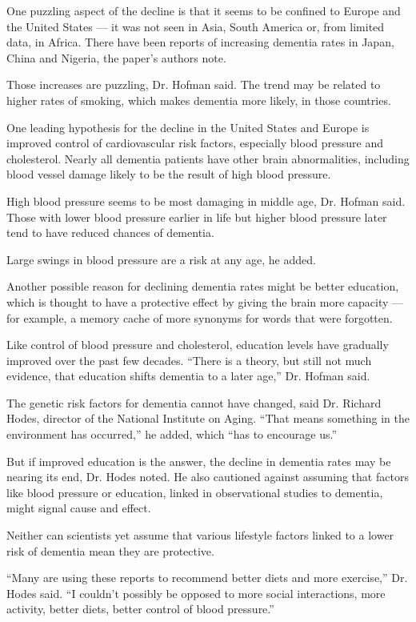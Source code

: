 One puzzling aspect of the decline is that it seems to be confined to
Europe and the United States --- it was not seen in Asia, South America
or, from limited data, in Africa. There have been reports of increasing
dementia rates in Japan, China and Nigeria, the paper's authors note.

Those increases are puzzling, Dr. Hofman said. The trend may be related
to higher rates of smoking, which makes dementia more likely, in those
countries.

One leading hypothesis for the decline in the United States and Europe
is improved control of cardiovascular risk factors, especially blood
pressure and cholesterol. Nearly all dementia patients have other brain
abnormalities, including blood vessel damage likely to be the result of
high blood pressure.

High blood pressure seems to be most damaging in middle age, Dr. Hofman
said. Those with lower blood pressure earlier in life but higher blood
pressure later tend to have reduced chances of dementia.

Large swings in blood pressure are a risk at any age, he added.

Another possible reason for declining dementia rates might be better
education, which is thought to have a protective effect by giving the
brain more capacity --- for example, a memory cache of more synonyms for
words that were forgotten.

Like control of blood pressure and cholesterol, education levels have
gradually improved over the past few decades. ``There is a theory, but
still not much evidence, that education shifts dementia to a later
age,'' Dr. Hofman said.

The genetic risk factors for dementia cannot have changed, said Dr.
Richard Hodes, director of the National Institute on Aging. ``That means
something in the environment has occurred,'' he added, which ``has to
encourage us.''

But if improved education is the answer, the decline in dementia rates
may be nearing its end, Dr. Hodes noted. He also cautioned against
assuming that factors like blood pressure or education, linked in
observational studies to dementia, might signal cause and effect.

Neither can scientists yet assume that various lifestyle factors linked
to a lower risk of dementia mean they are protective.

``Many are using these reports to recommend better diets and more
exercise,'' Dr. Hodes said. ``I couldn't possibly be opposed to more
social interactions, more activity, better diets, better control of
blood pressure.''

